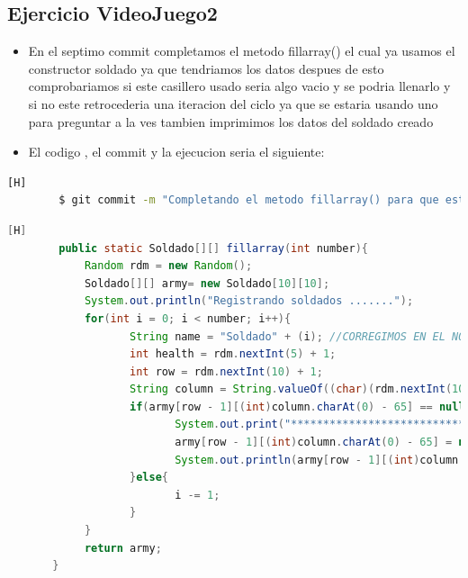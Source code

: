 \documentclass{article}
\begin{document}
	\subsection{Ejercicio VideoJuego2}
	\begin{itemize}	
		\item En el septimo commit completamos el metodo fillarray() el cual ya usamos el constructor soldado ya que tendriamos los datos despues de esto comprobariamos si este casillero usado seria algo vacio y se podria llenarlo y si no este retrocederia una iteracion del ciclo ya que se estaria usando uno para preguntar a la ves tambien imprimimos los datos del soldado creado 
		\item El codigo , el commit y la ejecucion seria el siguiente:
	\end{itemize}	
	\begin{lstlisting}[language=bash,caption={Commit}][H]
		$ git commit -m "Completando el metodo fillarray() para que este pueda imprmir los datos de los soldados que estan en el tablero este te devuelve el array lleno con la cantidad de soldados y texto que dice su informacion de cada soldado Y tambien cumplimos con el cual no se repita un soldado en el mismo casillero ya que al ver que este lleno este retrocedera una repeticion ya que estaria tomando la repeticion en un casillero lleno"
	\end{lstlisting}	
	\begin{lstlisting}[language=java,caption={Las lineas de codigos del metodo creado:}][H]
		public static Soldado[][] fillarray(int number){
			Random rdm = new Random();
			Soldado[][] army= new Soldado[10][10];
			System.out.println("Registrando soldados .......");
			for(int i = 0; i < number; i++){
				   String name = "Soldado" + (i); //CORREGIMOS EN EL NOMBRE YA QUE ESTE COMNEZABA DESDE EL 0
				   int health = rdm.nextInt(5) + 1;
				   int row = rdm.nextInt(10) + 1;
				   String column = String.valueOf((char)(rdm.nextInt(10) + 65));  
				   if(army[row - 1][(int)column.charAt(0) - 65] == null){
						  System.out.print("*********************************");
						  army[row - 1][(int)column.charAt(0) - 65] = new Soldado(name, health, row, column);
						  System.out.println(army[row - 1][(int)column.charAt(0) - 65].toString());
				   }else{
						  i -= 1;
				   }
			}
			return army;
	   }
	\end{lstlisting}
\end{document}
